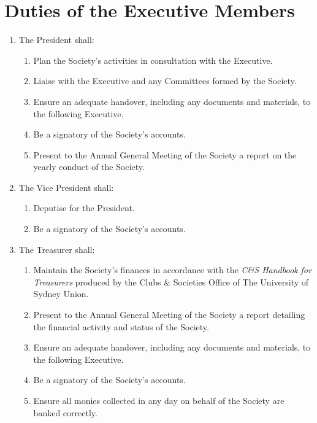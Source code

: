 \documentclass[11pt]{article}
\begin{document}
\section{Duties of the Executive Members}
\begin{enumerate}[\thesection .1]
    \item The President shall:
    \begin{enumerate}
        \item Plan the Society’s activities in consultation with the Executive.
        \item Liaise with the Executive and any Committees formed by the Society.	
        \item Ensure an adequate handover, including any documents and materials, to the following Executive.
        \item Be a signatory of the Society’s accounts.
        \item Present to the Annual General Meeting of the Society a report on the yearly conduct of the Society.
    \end{enumerate}
    \item The Vice President shall:
    \begin{enumerate}
        \item Deputise for the President.
        \item Be a signatory of the Society’s accounts.
    \end{enumerate}
    \item The Treasurer shall:
    \begin{enumerate}
        \item Maintain the Society’s finances in accordance with the \textit{C\&S Handbook for Treasurers} produced by the Clubs \& Societies Office of The University of Sydney Union.
        \item Present to the Annual General Meeting of the Society a report detailing the financial activity and status of the Society.
        \item Ensure an adequate handover, including any documents and materials, to the following Executive.
        \item Be a signatory of the Society’s accounts.
        \item Ensure all monies collected in any day on behalf of the Society are banked correctly.

\end{enumerate}
\end{enumerate}
\end{document}
